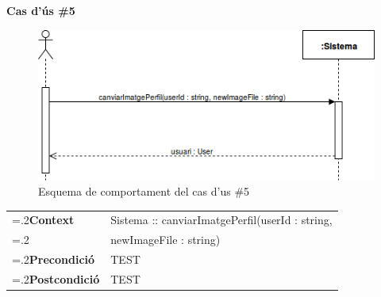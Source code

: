 \clearpage
\noindent\textbf{\large Cas d'ús \#5}\\
\begin{figure}[H]
\centering
\includegraphics[scale=0.6]{Figures/casdus_05.png}
\caption{Esquema de comportament del cas d'us \#5}
\end{figure}
\begin{table}[h]
\noindent
\begin{tabularx}{\linewidth}{
>{\hsize=.2\hsize}X%
>{\hsize=0.8\hsize}X%
}
\textbf{Context} 		& Sistema :: canviarImatgePerfil(userId : string, \\
						& newImageFile : string) \\
\textbf{Precondició} 	& TEST \\
\textbf{Postcondició}	& TEST \\
\end{tabularx}
\label{}
\end{table}

